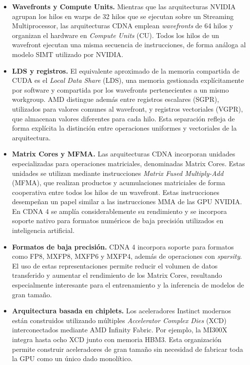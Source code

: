 \begin{itemize}

```
\item \textbf{Wavefronts y Compute Units.}
Mientras que las arquitecturas NVIDIA agrupan los hilos en warps de 32 hilos que se ejecutan sobre un Streaming Multiprocessor, las arquitecturas CDNA emplean \textit{wavefronts} de 64 hilos y organizan el hardware en \textit{Compute Units} (CU). Todos los hilos de un wavefront ejecutan una misma secuencia de instrucciones, de forma análoga al modelo SIMT utilizado por NVIDIA.

\item \textbf{LDS y registros.}
El equivalente aproximado de la memoria compartida de CUDA es el \textit{Local Data Share} (LDS), una memoria gestionada explícitamente por software y compartida por los wavefronts pertenecientes a un mismo workgroup. AMD distingue además entre registros escalares (SGPR), utilizados para valores comunes al wavefront, y registros vectoriales (VGPR), que almacenan valores diferentes para cada hilo. Esta separación refleja de forma explícita la distinción entre operaciones uniformes y vectoriales de la arquitectura.

\item \textbf{Matrix Cores y MFMA.}
Las arquitecturas CDNA incorporan unidades especializadas para operaciones matriciales, denominadas Matrix Cores. Estas unidades se utilizan mediante instrucciones \textit{Matrix Fused Multiply-Add} (MFMA), que realizan productos y acumulaciones matriciales de forma cooperativa entre todos los hilos de un wavefront. Estas instrucciones desempeñan un papel similar a las instrucciones MMA de las GPU NVIDIA. En CDNA 4 se amplía considerablemente su rendimiento y se incorpora soporte nativo para formatos numéricos de baja precisión utilizados en inteligencia artificial.

\item \textbf{Formatos de baja precisión.}
CDNA 4 incorpora soporte para formatos como FP8, MXFP8, MXFP6 y MXFP4, además de operaciones con \textit{sparsity}. El uso de estas representaciones permite reducir el volumen de datos transferido y aumentar el rendimiento de los Matrix Cores, resultando especialmente interesante para el entrenamiento y la inferencia de modelos de gran tamaño.

\item \textbf{Arquitectura basada en chiplets.}
Los aceleradores Instinct modernos están construidos utilizando múltiples \textit{Accelerator Complex Dies} (XCD) interconectados mediante AMD Infinity Fabric. Por ejemplo, la MI300X integra hasta ocho XCD junto con memoria HBM3. Esta organización permite construir aceleradores de gran tamaño sin necesidad de fabricar toda la GPU como un único dado monolítico.


\end{itemize}
